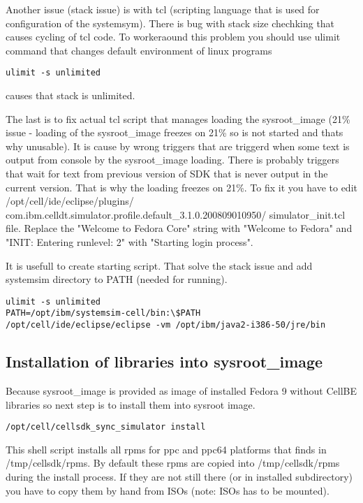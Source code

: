 \par
Another issue (stack issue) is with tcl (scripting language that is used for configuration of the systemsym). There is bug with stack size chechking that causes cycling of tcl code. To workeraound this problem you should use ulimit command that changes default environment of linux programs

\begin{verbatim}
ulimit -s unlimited
\end{verbatim}

causes that stack is unlimited.

\par
The last is to fix actual tcl script that manages loading the sysroot\_image (21\% issue - loading of the sysroot\_image freezes on 21\% so is not started and thats why unusable). It is cause by wrong triggers that are triggerd when some text is output from console by the sysroot\_image loading. There is probably triggers that wait for text from previous version of SDK that is never output in the current version. That is why the loading freezes on 21\%. To fix it you have to edit /opt/cell/ide/eclipse/plugins/ com.ibm.celldt.simulator.profile.default\_3.1.0.200809010950/ simulator\_init.tcl file. Replace the "Welcome to Fedora Core" string with "Welcome to Fedora" and "INIT: Entering runlevel: 2" with "Starting login process".

It is usefull to create starting script. That solve the stack issue and add systemsim directory to PATH (needed for running).

\begin{verbatim}
ulimit -s unlimited
PATH=/opt/ibm/systemsim-cell/bin:\$PATH
/opt/cell/ide/eclipse/eclipse -vm /opt/ibm/java2-i386-50/jre/bin
\end{verbatim}

\subsection{Installation of libraries into sysroot\_image}

Because sysroot\_image is provided as image of installed Fedora 9 without CellBE libraries so next step is to install them into sysroot image.

\begin{verbatim}
/opt/cell/cellsdk_sync_simulator install
\end{verbatim}

This shell script installs all rpms for ppc and ppc64 platforms that finds in /tmp/cellsdk/rpms. By default these rpms are copied into /tmp/cellsdk/rpms during the install process. If they are not still there (or in installed subdirectory) you have to copy them by hand from ISOs (note: ISOs has to be mounted).

